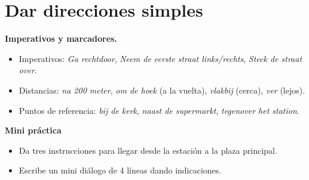 \section{Dar direcciones simples}
\textbf{Imperativos y marcadores.}
\begin{itemize}[leftmargin=*]
  \item Imperativos: \textit{Ga rechtdoor}, \textit{Neem de eerste straat links/rechts}, \textit{Steek de straat over}.
  \item Distancias: \textit{na 200 meter}, \textit{om de hoek} (a la vuelta), \textit{vlakbij} (cerca), \textit{ver} (lejos).
  \item Puntos de referencia: \textit{bij de kerk}, \textit{naast de supermarkt}, \textit{tegenover het station}.
\end{itemize}

\textbf{Mini práctica}
\begin{itemize}[leftmargin=*]
  \item Da tres instrucciones para llegar desde la estación a la plaza principal.
  \item Escribe un mini diálogo de 4 líneas dando indicaciones.
\end{itemize}
